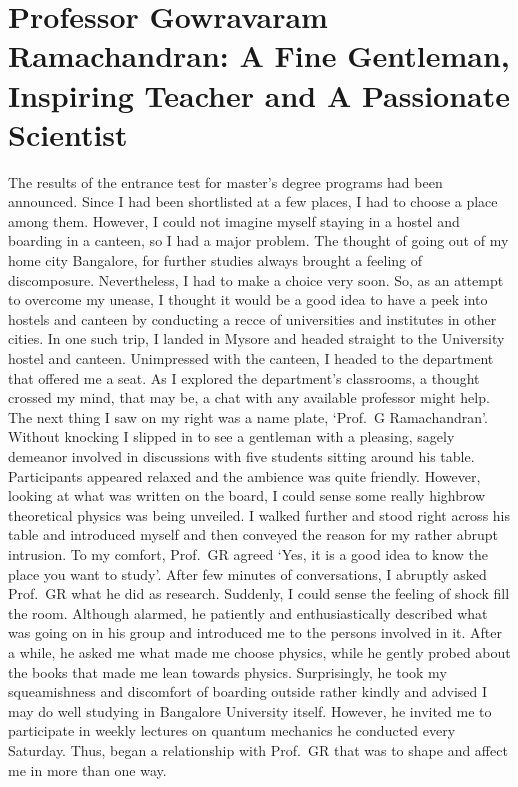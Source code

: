\chapter[A Fine Gentleman, Inspiring Teacher and A Passionate Scientist]{Professor Gowravaram Ramachandran: A Fine Gentleman, Inspiring Teacher and A Passionate Scientist}\label{chap31}


The results of the entrance test for master's degree programs had been announced.
Since I had been shortlisted at a few places, I had to choose a place among them.
However, I could not imagine myself staying in a hostel and boarding in a
canteen, so I had a major problem. The thought of going out of my home city
Bangalore, for further studies always brought a feeling of discomposure.
Nevertheless, I had to make a choice very soon. So, as an attempt to overcome
my unease, I thought it would be a good idea to have a peek into hostels and
canteen by conducting a recce of universities and institutes in other cities. In one
such trip, I landed in Mysore and headed straight to the University hostel and
canteen. Unimpressed with the canteen, I headed to the department that offered
me a seat. As I explored the department's classrooms, a thought crossed my mind,
that may be, a chat with any available professor might help. The next thing I saw
on my right was a name plate, `Prof.\ G Ramachandran'. Without knocking I
slipped in to see a gentleman with a pleasing, sagely demeanor involved in
discussions with five students sitting around his table. Participants appeared
relaxed and the ambience was quite friendly. However, looking at what was
written on the board, I could sense some really highbrow theoretical physics was
being unveiled. I walked further and stood right across his table and introduced
myself and then conveyed the reason for my rather abrupt intrusion. To my
comfort, Prof.\ GR agreed `Yes, it is a good idea to know the place you want to
study'. After few minutes of conversations, I abruptly asked Prof.\ GR what he did
as research. Suddenly, I could sense the feeling of shock fill the room. Although
alarmed, he patiently and enthusiastically described what was going on in his
group and introduced me to the persons involved in it. After a while, he asked me what
made me choose physics, while he gently probed about the books that made me 
lean towards physics. Surprisingly, he took my squeamishness and discomfort of
boarding outside rather kindly and advised I may do well studying in Bangalore
University itself. However, he invited me to participate in weekly lectures on
quantum mechanics he conducted every Saturday. Thus, began a relationship
with Prof.\ GR that was to shape and affect me in more than one way.

